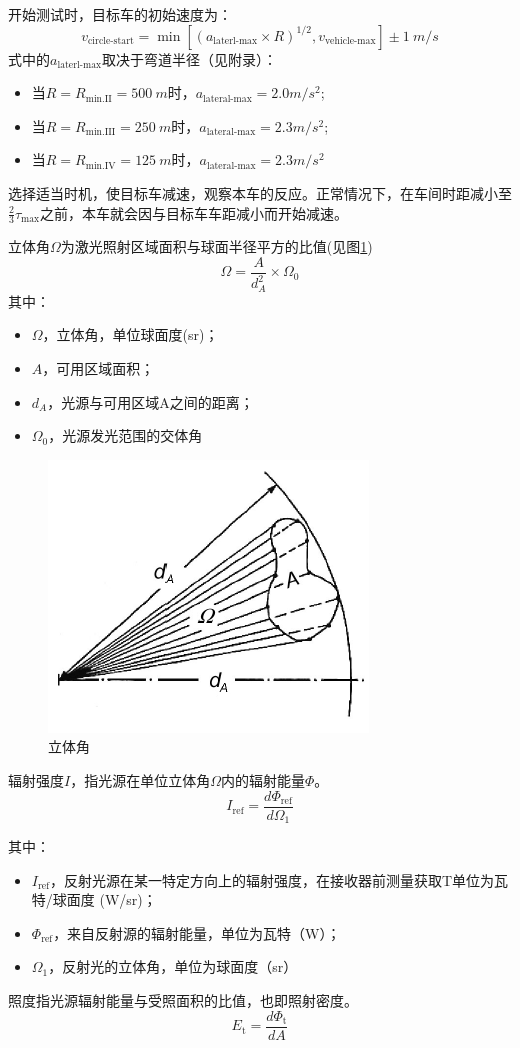 \documentclass[is,copyright,is]{isov2}
\begin{document}
开始测试时，目标车的初始速度为：
\[v_\text{circle-start}=\min
[(a_\text{laterl-max}\times R)^{1/2},v_\text{vehicle-max}]\pm \SI{1}{m/s}\]
式中的$a_\text{laterl-max}$取决于弯道半径（见附录）：
\begin{itemize}
	\item 当$R=R_\text{min.II} = \SI{500}{m}$时，$ a_\text{lateral-max} = 2.0 m/s^2$;
	\item 当$R=R_\text{min.III} = \SI{250}{m}$时，$ a_\text{lateral-max} = 2.3 m/s^2$;
	\item 当$R=R_\text{min.IV} = \SI{125}{m}$时，$ a_\text{lateral-max} = 2.3 m/s^2$
\end{itemize}

选择适当时机，使目标车减速，观察本车的反应。正常情况下，在车间时距减小至$\frac{2}{3}\tau_\text{max}$之前，本车就会因与目标车车距减小而开始减速。


立体角$\varOmega$为激光照射区域面积与球面半径平方的比值(见图\ref{fig:solidangle})
\[\varOmega = \frac{A}{d^2_A}\times\varOmega_0\]
其中：
\begin{itemize}
	\item $\varOmega$，立体角，单位球面度(sr)；
	\item $A$，可用区域面积；
	\item $d_A$，光源与可用区域A之间的距离；
	\item $\varOmega_0$，光源发光范围的交体角
\end{itemize}
\begin{figure}
	\centering
	\includegraphics[width=0.4\linewidth]{figures/solidangle}
	\caption{立体角}
	\label{fig:solidangle}
\end{figure}

辐射强度$I$，指光源在单位立体角$\varOmega$内的辐射能量$\Phi$。
\[I_\text{ref} =\frac{d\Phi_\text{ref}}{d\varOmega_1}\]

其中：
\begin{itemize}
	\item $I_\text{ref}$，反射光源在某一特定方向上的辐射强度，在接收器前测量获取T单位为瓦特/球面度 (W/sr)；
	\item $\Phi_\text{ref}$，来自反射源的辐射能量，单位为瓦特（W）；
	\item $\varOmega_1$，反射光的立体角，单位为球面度（sr）
\end{itemize}
照度指光源辐射能量与受照面积的比值，也即照射密度。
\[E_\text{t} =\frac{d\Phi_\text{t}}{dA}\]
\end{document}
